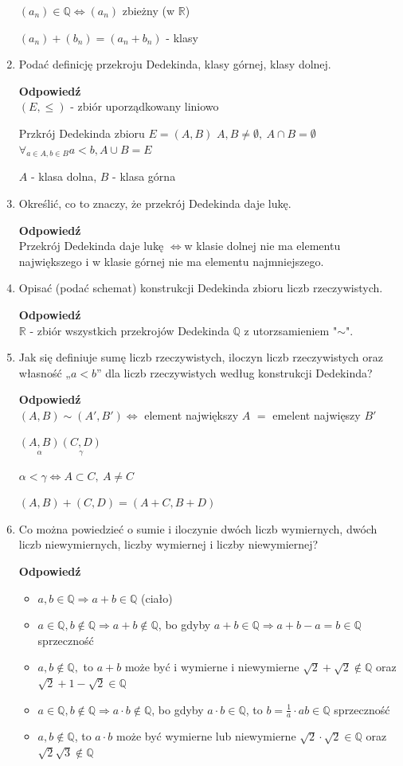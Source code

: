 \documentclass[12pt,a4paper]{article}
\theoremstyle{break}
\newcommand{\Odp}[1]{
		\begin{mdframed}[style=zadanie]
			\textbf{Odpowiedź}\\
			#1
		\end{mdframed}
	}
\newcommand{\witw}{$\Leftrightarrow$}
\begin{document}
\begin{enumerate}[1.]
{		$(a_n)\in \mathbb{Q} \Leftrightarrow (a_n)$ zbieżny (w $\mathbb{R}$)
		
		$(a_n)+(b_n)=(a_n + b_n)$ - klasy
	}
	
	\item Podać definicję przekroju Dedekinda, klasy górnej, klasy dolnej.
	\Odp{
		$(E,\leq)$ - zbiór uporządkowany liniowo
		
		Przkrój Dedekinda zbioru $E=(A,B)$
		$A,B\neq \emptyset, \: A\cap B = \emptyset$
		$\forall_{a\in A, b\in B} a<b, A\cup B=E$
		
		$A$ - klasa dolna, $B$ - klasa górna
	}
	
	\item Określić, co to znaczy, że przekrój Dedekinda daje lukę.
	\Odp{
		Przekrój Dedekinda daje lukę \witw w klasie dolnej nie ma elementu największego i w klasie górnej nie ma elementu najmniejszego.
	}
	
	\item Opisać (podać schemat) konstrukcji Dedekinda zbioru liczb rzeczywistych.
	\Odp{
		$\mathbb{R}$ - zbiór wszystkich przekrojów Dedekinda $\mathbb{Q}$ z utorzsamieniem "$\sim$".
	}
	
	\item Jak się definiuje sumę liczb rzeczywistych, iloczyn liczb rzeczywistych oraz własność	„$a < b$” dla liczb rzeczywistych według konstrukcji Dedekinda?
	\Odp{
		$(A,B) \sim (A',B') \Leftrightarrow$ element największy $A$ $=$ emelent najwięszy $B'$
		
		$\underset{\alpha}{(A,B)} \underset{\gamma}{(C,D)}$ 
		
		$\alpha<\gamma \Leftrightarrow A\subset C,\: A\neq C$
		
		$(A,B) + (C,D) = (A+C, B + D)$
	}
	
	\item Co można powiedzieć o sumie i iloczynie dwóch liczb wymiernych, dwóch liczb niewymiernych, liczby wymiernej i liczby niewymiernej?
	\Odp{
	\begin{itemize}
		\item $a,b\in \mathbb{Q} \Rightarrow a+b\in \mathbb{Q}$ (ciało)
		\item $a\in \mathbb{Q}, b\notin \mathbb{Q} \Rightarrow a+b\notin\mathbb{Q}$, bo gdyby $a+b\in \mathbb{Q} \Rightarrow a+b-a=b\in\mathbb{Q}$ sprzeczność
		\item $a,b\notin\mathbb{Q},$ to $a+b$ może być i wymierne i niewymierne
		$\sqrt{2}+\sqrt{2}\notin\mathbb{Q}$ oraz $\sqrt{2}+1-\sqrt{2}\in \mathbb{Q}$
		\item $a\in\mathbb{Q}, b\notin\mathbb{Q} \Rightarrow a\cdot b \notin \mathbb{Q}$, bo gdyby $a\cdot b \in \mathbb{Q}$, to $b=\frac{1}{a} \cdot ab \in \mathbb{Q}$ sprzeczność
		\item $a,b\notin\mathbb{Q}$, to $a\cdot b$ może być wymierne lub niewymierne
		$\sqrt{2}\cdot\sqrt{2}\in \mathbb{Q}$ oraz $\sqrt{2}\sqrt{3}\notin\mathbb{Q}$
	\end{itemize}
	}
	

\end{enumerate}
\end{document}
